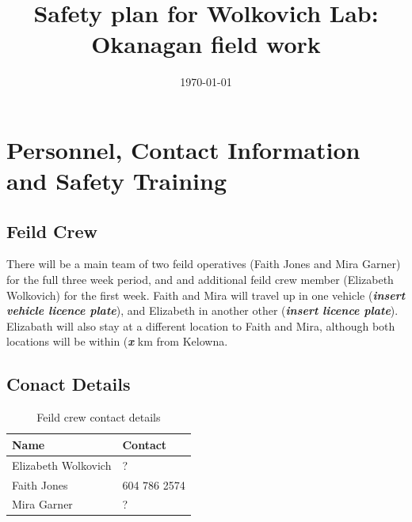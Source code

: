 \documentclass[11pt,letter]{article}
\begin{document}

\renewcommand{\refname}{\CHead{}}

\title{Safety plan for Wolkovich Lab: Okanagan field work}
\date{\today}
\maketitle
\tableofcontents

\section{Personnel, Contact Information and Safety Training}

\subsection {Feild Crew}

There will be a main team of two feild operatives (Faith Jones and Mira Garner) for the full three week period, and and additional feild crew member (Elizabeth Wolkovich) for the first week. Faith and Mira will travel up in one vehicle (\textbf{\textit{insert vehicle licence plate}}), and Elizabeth in another other (\textbf{\textit{insert licence plate}}). Elizabath will also stay at a different location to Faith and Mira, although both locations will be within (\textbf{\textit{x}} km from Kelowna.   

\subsection {Conact Details}

\begin{table}[H]
\caption{Feild crew contact details} %
\begin{tabular}{ l | l }  %
\hline\hline %
Name & Contact\\ [0.5ex] %
\hline %
Elizabeth Wolkovich & ? \\ %
Faith Jones & 604 786 2574 \\
Mira Garner & ? \\
\hline %
\end{tabular}
\label{table:nonlin} %
\end{table}
\end{document}
